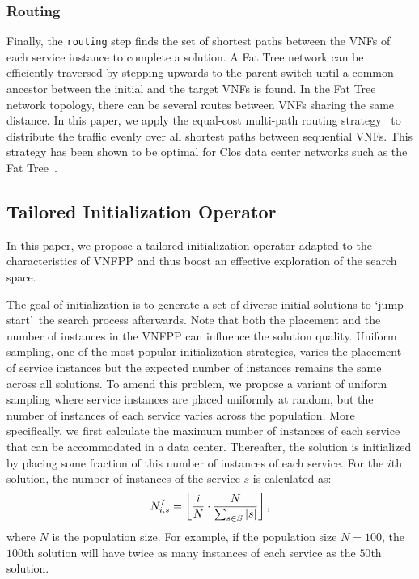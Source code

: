 \subsubsection{Routing}

Finally, the \texttt{routing} step finds the set of shortest paths between the VNFs of each service instance to complete a solution. A Fat Tree network can be efficiently traversed by stepping upwards to the parent switch until a common ancestor between the initial and the target VNFs is found. In the Fat Tree network topology, there can be several routes between VNFs sharing the same distance. In this paper, we apply the equal-cost multi-path routing strategy~\cite{Hopps2000} to distribute the traffic evenly over all shortest paths between sequential VNFs. This strategy has been shown to be optimal for Clos data center networks such as the Fat Tree~\cite{ChiesaKS17}.

\subsection{Tailored Initialization Operator}
\label{sec:operators}

In this paper, we propose a tailored initialization operator adapted to the characteristics of VNFPP and thus boost an effective exploration of the search space.

The goal of initialization is to generate a set of diverse initial solutions to \lq jump start\rq\ the search process afterwards. Note that both the placement and the number of instances in the VNFPP can influence the solution quality. Uniform sampling, one of the most popular initialization strategies, varies the placement of service instances but the expected number of instances remains the same across all solutions. To amend this problem, we propose a variant of uniform sampling where service instances are placed uniformly at random, but the number of instances of each service varies across the population. More specifically, we first calculate the maximum number of instances of each service that can be accommodated in a data center. Thereafter, the solution is initialized by placing some fraction of this number of instances of each service. For the $i$th solution, the number of instances of the service $s$ is calculated as:
\begin{equation}
	N^I_{i,s} = \left\lfloor \frac{i}{N} \cdot \frac{N}{\sum_{s\in S} \left\lvert s \right\rvert} \right\rfloor,
	\label{eq:num_services}
\end{equation}
where $N$ is the population size. For example, if the population size $N=100$, the $100$th solution will have twice as many instances of each service as the $50$th solution.

